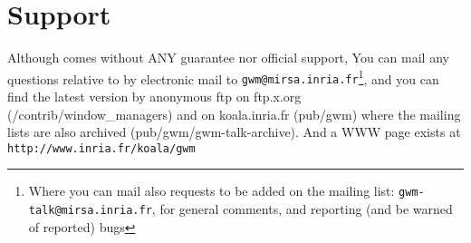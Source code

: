 \section*{Support}

\sloppy Although {\GWM} comes without ANY guarantee nor official support, 
You can mail any questions relative to {\GWM} by electronic mail to
{\tt gwm@mirsa.inria.fr}\footnote{Where you can mail also requests to be added
on the mailing list: {\tt gwm-talk@mirsa.inria.fr}, for general comments, and
reporting (and be warned of reported) bugs}, and you can find the latest
{\GWM} version by anonymous ftp on ftp.x.org (/contrib/window\_managers) and
on koala.inria.fr (pub/gwm) where the mailing lists are also archived
(pub/gwm/gwm-talk-archive). And a WWW page exists at 
{\tt http://www.inria.fr/koala/gwm}
